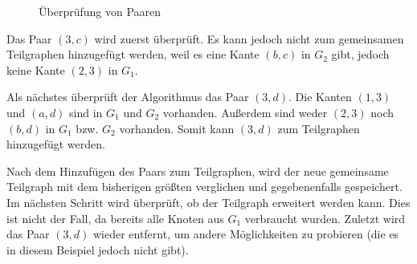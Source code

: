 \begin{figure}[htb]
\centering
\hspace*{\fill}
\hspace*{\fill}
\hspace*{\fill}
\caption{Überprüfung von Paaren}
\label{pic:bsp_McGregor_pairs}
\end{figure}

Das Paar $(3,c)$ wird 
zuerst überprüft. Es kann jedoch nicht zum gemeinsamen Teilgraphen hinzugefügt 
werden, weil es eine Kante $(b,c)$ in $G_2$ gibt, jedoch keine 
Kante $(2,3)$ in $G_1$.

Als nächstes überprüft der Algorithmus das Paar $(3,d)$. Die Kanten $(1,3)$ 
und $(a,d)$ sind in $G_1$ und $G_2$ vorhanden. Außerdem sind weder $(2,3)$ 
noch $(b,d)$ in $G_1$ bzw. $G_2$ vorhanden. Somit kann $(3,d)$ zum 
Teilgraphen hinzugefügt werden. 

Nach dem Hinzufügen des Paars zum Teilgraphen, wird der neue gemeinsame 
Teilgraph mit dem bisherigen größten verglichen und gegebenenfalls gespeichert. 
Im nächsten Schritt wird überprüft, ob der Teilgraph erweitert werden kann. 
Dies ist nicht der Fall, da bereits alle Knoten aus $G_1$ verbraucht wurden. 
Zuletzt wird das Paar $(3,d)$ wieder entfernt, um andere Möglichkeiten zu probieren 
(die es in diesem Beispiel jedoch nicht gibt). 

